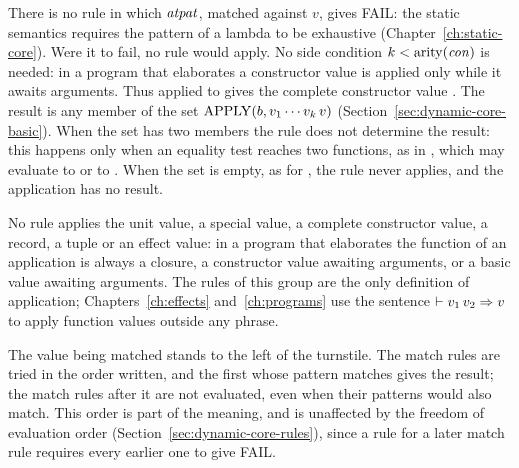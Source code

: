   {}

\begin{rulecomments}
 There is no rule in which $\mathit{atpat}$, matched
against $v$, gives FAIL: the static semantics requires the pattern of a
lambda to be exhaustive (Chapter~\ref{ch:static-core}). Were it to fail, no
rule would apply.
 No side condition $k<\mathrm{arity}(\mathit{con})$ is needed: in a
program that elaborates a constructor value is applied only while it awaits
arguments. Thus  applied to  gives the complete constructor
value .
 The result is any member of the set
$\mathrm{APPLY}(b,v_1\cdots v_k\,v)$
(Section~\ref{sec:dynamic-core-basic}). When the set has two members the rule
does not determine the result: this happens only when an equality test
reaches two functions, as in , which may evaluate to  or to . When the set is
empty, as for , the rule never applies, and the application
has no result. %
\end{rulecomments}

No rule applies the unit value, a special value, a complete constructor
value, a record, a tuple or an effect value: in a program that elaborates the
function of an application is always a closure, a constructor value awaiting
arguments, or a basic value awaiting arguments. The rules of this group are
the only definition of application; Chapters~\ref{ch:effects}
and~\ref{ch:programs} use the sentence $\vdash v_1\,v_2 \Rightarrow v$ to apply function
values outside any phrase.


  {}

  {}

  {}

\begin{rulecomments}
 The value being matched stands to the left of
the turnstile. The match rules are tried in the
order written, and the first whose pattern matches gives the result; the
match rules after it are not evaluated, even when their patterns would also
match. This order is part of the meaning, and is unaffected by the freedom of
evaluation order (Section~\ref{sec:dynamic-core-rules}), since a rule for a
later match rule requires every earlier one to give FAIL.
\end{rulecomments}

